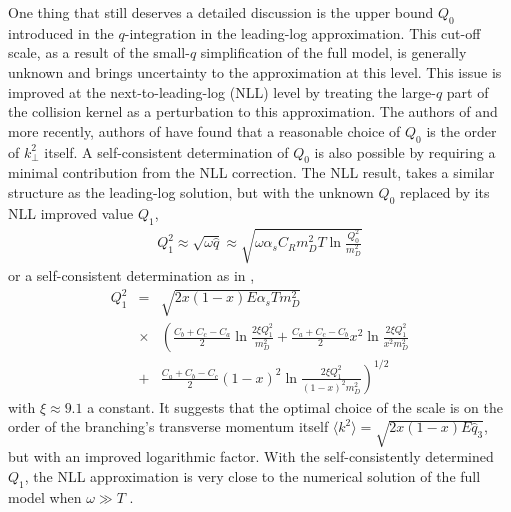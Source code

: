 One thing that still deserves a detailed discussion is the upper bound $Q_0$ introduced in the $q$-integration in the leading-log approximation.
This cut-off scale, as a result of the small-$q$ simplification of the full model, is generally unknown and brings uncertainty to the approximation at this level.
This issue is improved at the next-to-leading-log (NLL) level by treating the large-$q$ part of the collision kernel as a perturbation to this approximation.
The authors of \cite{Arnold:2008zu} and more recently, authors of \cite{Mehtar-Tani:2019tvy} have found that a reasonable choice of $Q_0$ is the order of $k_\perp^2$ itself.
A self-consistent determination of $Q_0$ is also possible by requiring a minimal contribution from the NLL correction.
The NLL result, takes a similar structure as the leading-log solution, but with the unknown $Q_0$ replaced by its NLL improved value $Q_{1}$,
\begin{eqnarray}
Q_1^2  \approx \sqrt{\omega \hat{q}} \approx \sqrt{\omega \alpha_s C_R m_D^2 T \ln\frac{Q_0^2}{m_D^2}}
\label{eq:Q1}
\end{eqnarray}
or a self-consistent determination as in \cite{Arnold:2008zu},
\begin{eqnarray}
Q_1^2 &=& \sqrt{2 x (1-x) E \alpha_s T m_D^2}\\\nonumber
&\times & \left(
\frac{C_b+C_c-C_a}{2}\ln\frac{2\xi Q_1^2}{m_D^2} + \frac{C_a+C_c-C_b}{2} x^2 \ln\frac{2\xi Q_1^2}{x^2 m_D^2} \right.\\\nonumber 
&+& \left.\frac{C_a+C_b-C_c}{2} (1-x)^2 \ln\frac{2\xi Q_1^2}{(1-x)^2 m_D^2} \right)^{1/2}
\label{eq:Q1-sf}
\end{eqnarray}
with $\xi \approx 9.1$ a constant. 
It suggests that the optimal choice of the scale is on the order of the branching's transverse momentum itself $\langle k^2 \rangle = \sqrt{2x(1-x)E\hat{q}_3}$, but with an improved logarithmic factor.
With the self-consistently determined $Q_1$, the NLL approximation is very close to the numerical solution of the full model when $\omega \gg T$ \cite{Arnold:2008zu}.

